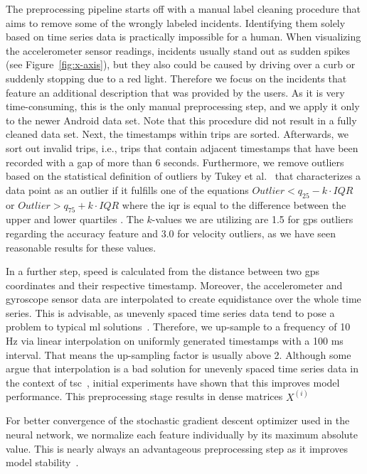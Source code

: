 The preprocessing pipeline starts off with a manual label cleaning procedure that aims to remove some of the wrongly labeled incidents.
Identifying them solely based on time series data is practically impossible for a human.
When visualizing the accelerometer sensor readings, incidents usually stand out as sudden spikes (see Figure~\ref{fig:x-axis}), but they also could be caused by driving over a curb or suddenly stopping due to a red light.
Therefore we focus on the incidents that feature an additional description that was provided by the users.
As it is very time-consuming, this is the only manual preprocessing step, and we apply it only to the newer Android data set.
Note that this procedure did not result in a fully cleaned data set.
Next, the timestamps within trips are sorted.
Afterwards, we sort out invalid trips, i.e., trips that contain adjacent timestamps that have been recorded with a gap of more than 6 seconds.
Furthermore, we remove outliers based on the statistical definition of outliers by Tukey et al.~\cite{tukey1977exploratory} that characterizes a data point as an outlier if it fulfills one of the equations $Outlier < q_{25} - k \cdot IQR$ or $Outlier > q_{75} + k \cdot IQR$ where the \ac{iqr} is equal to the difference between the upper and lower quartiles \cite{upton1996understanding, zwillinger1999crc}.
The $k$-values we are utilizing are 1.5 for \ac{gps} outliers regarding the accuracy feature and 3.0 for velocity outliers, as we have seen reasonable results for these values.

In a further step, speed is calculated from the distance between two \ac{gps} coordinates and their respective timestamp.
Moreover, the accelerometer and gyroscope sensor data are interpolated to create equidistance over the whole time series.
This is advisable, as unevenly spaced time series data tend to pose a problem to typical \ac{ml} solutions~\cite{weerakody2021review}.
Therefore, we up-sample to a frequency of 10 Hz via linear interpolation on uniformly generated timestamps with a 100 ms interval.
That means the up-sampling factor is usually above 2.
Although some argue that interpolation is a bad solution for unevenly spaced time series data in the context of \ac{tsc}~\cite{hayashi2005covariance, eckner2012framework}, initial experiments have shown that this improves model performance.
This preprocessing stage results in dense matrices $X^{(i)}$

For better convergence of the stochastic gradient descent optimizer used in the neural network, we normalize each feature individually by its maximum absolute value.
This is nearly always an advantageous preprocessing step as it improves model stability~\cite{bishop1995neural}.

